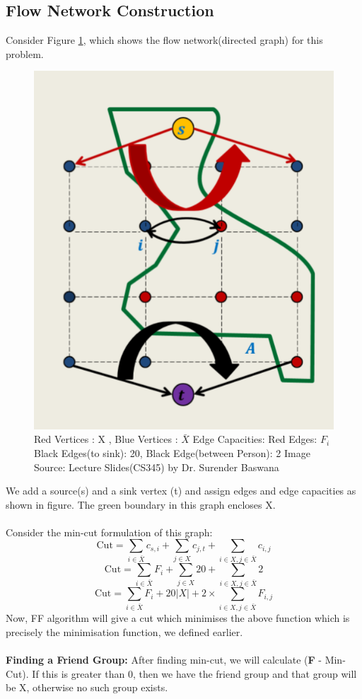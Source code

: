 \documentclass{article}
\begin{document}
\subsection{Flow Network Construction}
Consider Figure \ref{min}, which shows the flow network(directed graph) for this problem.
\begin{figure}[h!]
\centering
\includegraphics[width=0.5\columnwidth]{fig_minCut.png}
\caption{ Red Vertices : X , Blue Vertices : $\bar{X}$ \newline Edge Capacities: Red Edges: $F_i$ Black Edges(to sink): 20, Black Edge(between Person): 2 \newline Image Source: Lecture Slides(CS345) by Dr. Surender Baswana}
\label{min}
\end{figure}
\newline
We add a source(s) and a sink vertex (t) and assign edges and edge capacities as shown in figure. The green boundary in this graph encloses X. \\ \\
Consider the min-cut formulation of this graph:
$$ \text{Cut} = \sum_{i \in \bar{X}}c_{s,i} + \sum_{j \in X}c_{j,t} + \sum_{i \in X , j \in \bar{X}}c_{i,j}$$
$$ \text{Cut} = \sum_{i \in \bar{X}}F_i + \sum_{j \in X}20 + \sum_{i \in X , j \in \bar{X}}2$$
$$ \text{Cut} = \sum_{i \in \bar{X}}F_i +20|X| + 2 \times \sum_{i \in X, j \in \bar{X}}F_{i,j}$$
Now, FF algorithm will give a cut which minimises the above function which is precisely the minimisation function, we defined earlier.\\ \\
\textbf{Finding a Friend Group:} After finding min-cut, we will calculate (\textbf{F} - Min-Cut). If this is greater than 0, then we have the friend group and that group will be X, otherwise no such group exists.
\end{document}
